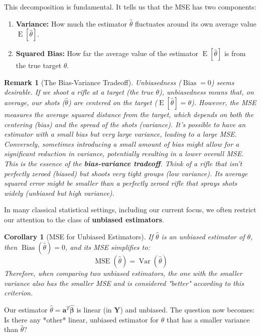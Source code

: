 \documentclass[11pt]{article}
\theoremstyle{mytheoremstyle}
\newtheorem{corollary}[theorem]{Corollary}
\theoremstyle{mydefinitionstyle}
\newtheorem{remark}[theorem]{Remark}
\newcommand{\vect}[1]{\mathbf{#1}}
\DeclareMathOperator{\E}{E}
\DeclareMathOperator{\Var}{Var}
\DeclareMathOperator{\Bias}{Bias}
\DeclareMathOperator{\MSE}{MSE}
\begin{document}
This decomposition is fundamental. It tells us that the MSE has two components:
\begin{enumerate}
    \item \textbf{Variance:} How much the estimator $\hat{\theta}$ fluctuates around its own average value $\E[\hat{\theta}]$.
    \item \textbf{Squared Bias:} How far the average value of the estimator $\E[\hat{\theta}]$ is from the true target $\theta$.
\end{enumerate}

\begin{remark}[The Bias-Variance Tradeoff]
Unbiasedness ($\Bias=0$) seems desirable. If we shoot a rifle at a target (the true $\theta$), unbiasedness means that, on average, our shots ($\hat{\theta}$) are centered on the target ($\E[\hat{\theta}] = \theta$). However, the MSE measures the average squared distance from the target, which depends on both the centering (bias) and the spread of the shots (variance).
It's possible to have an estimator with a small bias but very large variance, leading to a large MSE. Conversely, sometimes introducing a small amount of bias might allow for a significant reduction in variance, potentially resulting in a lower overall MSE. This is the essence of the \textbf{bias-variance tradeoff}. Think of a rifle that isn't perfectly zeroed (biased) but shoots very tight groups (low variance). Its average squared error might be smaller than a perfectly zeroed rifle that sprays shots widely (unbiased but high variance).
\end{remark}

In many classical statistical settings, including our current focus, we often restrict our attention to the class of \textbf{unbiased estimators}.

\begin{corollary}[MSE for Unbiased Estimators]
If $\hat{\theta}$ is an unbiased estimator of $\theta$, then $\Bias(\hat{\theta}) = 0$, and its MSE simplifies to:
\begin{equation*}
\MSE(\hat{\theta}) = \Var(\hat{\theta})
\end{equation*}
Therefore, when comparing two unbiased estimators, the one with the smaller variance also has the smaller MSE and is considered "better" according to this criterion.
\end{corollary}

Our estimator $\hat{\theta} = \vect{a}^T \hat{\vect{\beta}}$ is linear (in $\vect{Y}$) and unbiased. The question now becomes: Is there any *other* linear, unbiased estimator for $\theta$ that has a smaller variance than $\hat{\theta}$?
\end{document}
